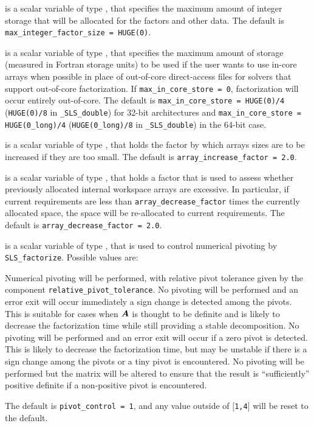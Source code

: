 \documentclass{galahad}
\newcommand{\packagename}{SLS}
\newcommand{\fullpackagename}{\libraryname\_\-\packagename}
\begin{document}
\begin{description}
 is a scalar variable of type \longinteger,
that specifies the maximum amount of integer storage that will be
allocated for the factors and other data.
The default is {\tt max\_integer\_factor\_size = HUGE(0)}.

 is a scalar variable of type \longinteger,
that specifies the maximum amount of storage (measured in Fortran storage units)
to be used if the user wants to use in-core arrays when possible in place of
out-of-core direct-access files for solvers that support out-of-core
factorization. If {\tt max\_in\_core\_store = 0}, factorization will
occur entirely out-of-core.
The default is {\tt max\_in\_core\_store = HUGE(0)/4}
({\tt HUGE(0)/8} in {\tt \fullpackagename\-\_\-double})
for 32-bit architectures and
{\tt max\_in\_core\_store = HUGE(0\_long)/4}
({\tt HUGE(0\_long)/8}
in {\tt \fullpackagename\-\_\-double})
in the 64-bit case.

 is a scalar variable of type \realdp, that holds
the factor by which arrays sizes are to be increased if they are too small.
The default is {\tt array\_increase\_factor = 2.0}.

 is a scalar variable of type \realdp, that holds
a factor that is used to assess whether previously allocated internal
workspace arrays are excessive. In particular, if current requirements are
less than {\tt array\_decrease\_factor} times the currently allocated space,
the space will be re-allocated to current requirements.
The default is {\tt array\_decrease\_factor = 2.0}.

 is a scalar variable of type \integer,
that is used to control numerical pivoting by {\tt \packagename\_\-factorize}.
Possible values are:
\begin{description}
   Numerical pivoting will be performed, with relative pivot
     tolerance given by the component {\tt relative\_\-pivot\_tolerance}.
   No pivoting will be performed and an error exit will occur
     immediately a sign change is detected among the pivots. This is
     suitable for cases when ${\bm{A}}$  is thought to be definite and is likely to
     decrease the factorization time while still providing a stable
     decomposition.
   No pivoting will be performed and an error exit will occur if a
     zero pivot is detected. This is likely to decrease the factorization
     time, but may be unstable if there is a sign change among the pivots
     or a tiny pivot is encountered.
   No pivoting will be performed but the matrix will be altered
     to ensure that the result is ``sufficiently'' positive definite
     if a non-positive pivot is encountered.
\end{description}
The default is {\tt pivot\_control = 1}, and any value outside of
$[${\tt1,4}$]$ will be reset to the default.


\end{description}
\end{document}

